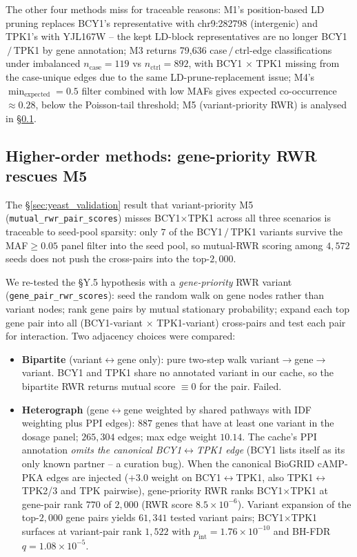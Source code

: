 The other four methods miss for traceable reasons:
M1's position-based LD pruning replaces BCY1's representative with
chr9:282798 (intergenic) and TPK1's with YJL167W -- the kept LD-block
representatives are no longer BCY1$\,/\,$TPK1 by gene annotation; M3
returns 79{,}636 case$\,/\,$ctrl-edge classifications under
imbalanced $n_{\mathrm{case}}=119$ vs $n_{\mathrm{ctrl}}=892$, with
BCY1$\,\times\,$TPK1 missing from the case-unique edges due to the same
LD-prune-replacement issue; M4's $\min_{\mathrm{expected}}=0.5$ filter
combined with low MAFs gives expected co-occurrence $\approx 0.28$,
below the Poisson-tail threshold; M5 (variant-priority RWR) is
analysed in §\ref{sec:higher_order}.

\subsection{Higher-order methods: gene-priority RWR rescues M5}\label{sec:higher_order}

The §\ref{sec:yeast_validation} result that variant-priority M5
(\texttt{mutual\_rwr\_pair\_scores}) misses BCY1$\times$TPK1 across all
three scenarios is traceable to seed-pool sparsity: only $7$ of the
BCY1$\,/\,$TPK1 variants survive the MAF$\geq 0.05$ panel filter into the
seed pool, so mutual-RWR scoring among $4{,}572$ seeds does not push
the cross-pairs into the top-$2{,}000$.

We re-tested the §Y.5 hypothesis with a \emph{gene-priority} RWR
variant (\texttt{gene\_pair\_rwr\_scores}): seed the random walk on
gene nodes rather than variant nodes; rank gene pairs by mutual
stationary probability; expand each top gene pair into all
(BCY1-variant $\times$ TPK1-variant) cross-pairs and test each pair for
interaction. Two adjacency choices were compared:

\begin{itemize}\setlength{\itemsep}{0pt}
\item \textbf{Bipartite} (variant$\leftrightarrow$gene only): pure two-step
      walk variant$\to$gene$\to$variant. BCY1 and TPK1 share no annotated
      variant in our cache, so the bipartite RWR returns mutual score
      $\equiv 0$ for the pair. Failed.
\item \textbf{Heterograph} (gene$\leftrightarrow$gene weighted by shared
      pathways with IDF weighting plus PPI edges): $887$ genes that have
      at least one variant in the dosage panel; $265{,}304$ edges; max
      edge weight $10.14$. The cache's PPI annotation
      \emph{omits the canonical BCY1$\leftrightarrow$TPK1 edge} (BCY1
      lists itself as its only known partner -- a curation bug). When
      the canonical BioGRID cAMP-PKA edges are injected
      ($+3.0$ weight on BCY1$\leftrightarrow$TPK1, also TPK1$\leftrightarrow$TPK2/3
      and TPK pairwise), gene-priority RWR ranks BCY1$\times$TPK1 at gene-pair
      rank $770$ of $2{,}000$ (RWR score $8.5\times10^{-6}$). Variant
      expansion of the top-$2{,}000$ gene pairs yields $61{,}341$
      tested variant pairs; BCY1$\times$TPK1 surfaces at variant-pair rank
      $1{,}522$ with $p_{\mathrm{int}}=1.76\times10^{-10}$ and BH-FDR
      $q=1.08\times10^{-5}$.
\end{itemize}

